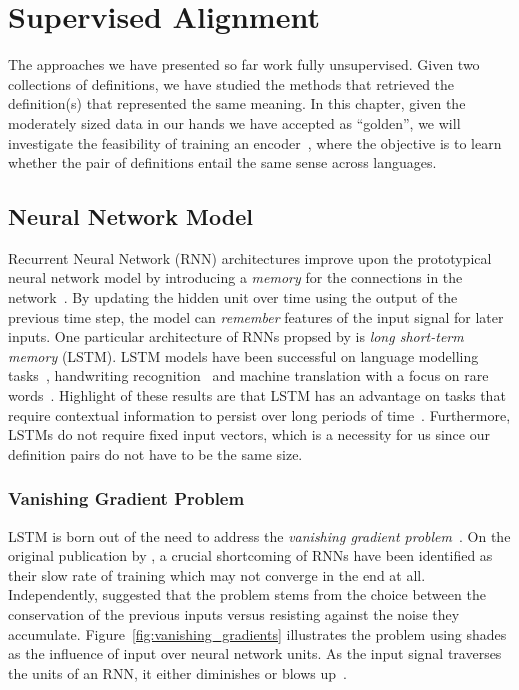 
\chapter{Supervised Alignment}%
\label{chap:supervised_validation}

The approaches we have presented so far work fully unsupervised.
Given two collections of definitions, we have studied the methods that retrieved the definition(s) that represented the same meaning.
In this chapter, given the moderately sized data in our hands we have accepted as \enquote{golden}, we will investigate the feasibility of training an encoder~\cite{sutskever_sequence_2014}, where the objective is to learn whether the pair of definitions entail the same sense across languages.

\section{Neural Network Model}%
\label{sec:neural_network_model}

Recurrent Neural Network (RNN) architectures improve upon the prototypical neural network model by introducing a \emph{memory} for the connections in the network~\cite{rumelhart_learning_1986}.
By updating the hidden unit over time using the output of the previous time step, the model can \emph{remember} features of the input signal for later inputs.
One particular architecture of RNNs propsed by \textcite{hochreiter_long_1997} is \emph{long short-term memory} (LSTM).
LSTM models have been successful on language modelling tasks~\cite{sutskever_sequence_2014}, handwriting recognition~\cite{graves_unconstrained_2008,graves_novel_2009} and machine translation with a focus on rare words~\cite{luong_addressing_2014}.
Highlight of these results are that LSTM has an advantage on tasks that require contextual information to persist over long periods of time~\cite{graves_long_2012}.
Furthermore, LSTMs do not require fixed input vectors, which is a necessity for us since our definition pairs do not have to be the same size.

\subsection{Vanishing Gradient Problem}%
\label{sub:vanishing_gradient_problem}

LSTM is born out of the need to address the \emph{vanishing gradient problem}~\cite{hochreiter_long_1997, bengio_learning_1994}.
On the original publication by \textcite{hochreiter_long_1997}, a crucial shortcoming of RNNs have been identified as their slow rate of training which may not converge in the end at all.
Independently, \textcite{bengio_learning_1994} suggested that the problem stems from the choice between the conservation of the previous inputs versus resisting against the noise they accumulate.
Figure~\ref{fig:vanishing_gradients} illustrates the problem using shades as the influence of input over neural network units.
As the input signal traverses the units of an RNN, it either diminishes or blows up~\cite{graves_long_2012}.

